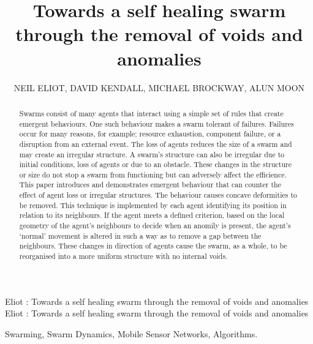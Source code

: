 \documentclass{ieeeaccess}
\begin{document}
\title{Towards a self healing swarm through the removal of voids and anomalies}
\author{\uppercase{Neil Eliot},
\uppercase{David Kendall, Michael Brockway, Alun Moon}}
\address[1]{Northumbria University, Department of Computing and Information Sciences, Newcastle upon Tyne, NE1 8ST}
\markboth
{Eliot \headeretal: Towards a self healing swarm through the removal of voids and anomalies}
{Eliot \headeretal: Towards a self healing swarm through the removal of voids and anomalies}
\begin{abstract}
Swarms consist of many agents that interact using a simple set of rules that create emergent behaviours. One such behaviour makes a swarm tolerant of failures. Failures occur for many reasons, for example; resource exhaustion, component failure, or a disruption from an external event. The loss of agents reduces the size of a swarm and may create an irregular structure. A swarm's structure can also be irregular due to initial conditions, loss of agents or due to an obstacle. These changes in the structure or size do not stop a swarm from functioning but can adversely affect the efficience. This paper introduces and demonstrates emergent behaviour that can counter the effect of agent loss or irregular structures. The behaviour causes concave deformities to be removed. This technique is implemented by each agent identifying its position in relation to its neighbours. If the agent meets a defined criterion, based on the local geometry of the agent's neighbours to decide when an anomily is present, the agent's `normal' movement is altered in such a way as to remove a gap between the neighbours. These changes in direction of agents cause the swarm, as a whole, to be reorganised into a more uniform structure with no internal voids.
\end{abstract}
\begin{IEEEkeywords}
Swarming, Swarm Dynamics, Mobile Sensor Networks, Algorithms.
\end{IEEEkeywords}
\titlepgskip=-15pt
\maketitle
\end{document}
